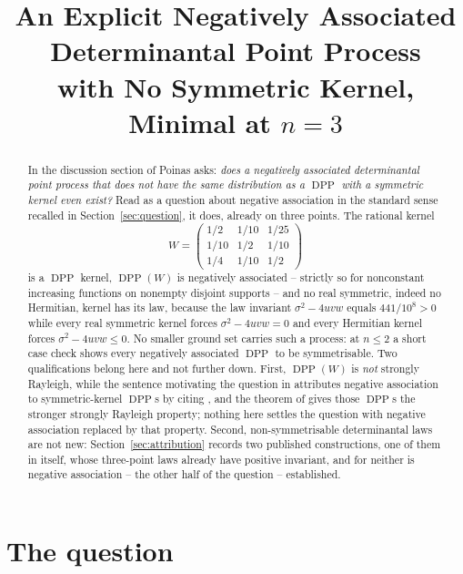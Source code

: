 \documentclass[11pt]{amsart}
\title[An explicit negatively associated DPP with no symmetric kernel]
{An Explicit Negatively Associated Determinantal Point Process\\ with No Symmetric Kernel,
Minimal at $n=3$}
\date{}
\theoremstyle{remark}
\DeclareMathOperator{\DPP}{DPP}
\begin{document}
\begin{abstract}
In the discussion section of \cite{Poinas} Poinas asks: \emph{does a negatively associated
determinantal point process that does not have the same distribution as a $\DPP$ with a
symmetric kernel even exist?} Read as a question about negative association in the standard
sense recalled in Section~\ref{sec:question}, it does, already on three points. The
rational kernel
\[
 W=\begin{pmatrix}
  1/2 & 1/10 & 1/25\\ 1/10 & 1/2 & 1/10\\ 1/4 & 1/10 & 1/2
 \end{pmatrix}
\]
is a $\DPP$ kernel, $\DPP(W)$ is negatively associated -- strictly so for nonconstant
increasing functions on nonempty disjoint supports -- and no real symmetric, indeed no
Hermitian, kernel has its law, because the law invariant $\sigma^{2}-4uvw$ equals
$441/10^{8}>0$ while every real symmetric kernel forces $\sigma^{2}-4uvw=0$ and every
Hermitian kernel forces $\sigma^{2}-4uvw\le0$. No smaller ground set carries such a process:
at $n\le2$ a short case check shows every negatively associated $\DPP$ to be symmetrisable.
Two qualifications belong here and not further down. First, $\DPP(W)$ is \emph{not} strongly
Rayleigh, while the sentence motivating the question in \cite{Poinas} attributes negative
association to symmetric-kernel $\DPP$s by citing \cite{BBL,Lyons}, and the theorem of
\cite{BBL} gives those $\DPP$s the stronger strongly Rayleigh property; nothing here settles
the question with
negative association replaced by that property. Second, non-symmetrisable determinantal laws
are not new: Section~\ref{sec:attribution} records two published constructions, one of them in
\cite{Poinas} itself, whose three-point laws already have positive invariant, and for neither
is negative association -- the other half of the question -- established.
\end{abstract}

\maketitle

\section{The question}\label{sec:question}
\end{document}
